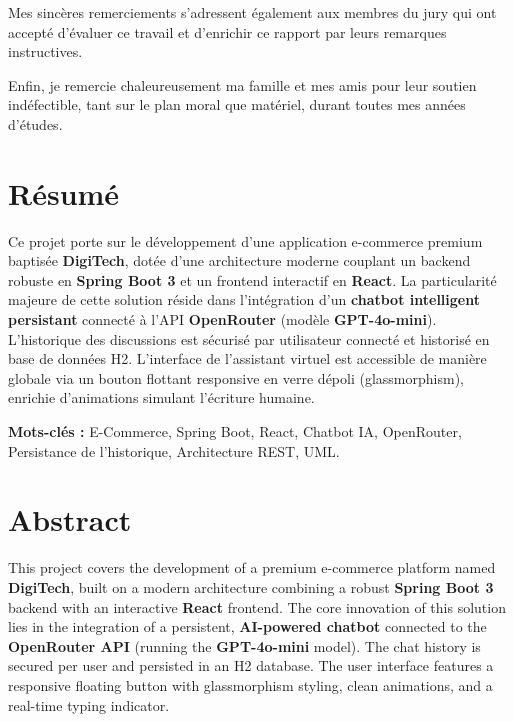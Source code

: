 \documentclass[12pt,a4paper,oneside]{report}
\begin{document}
Mes sincères remerciements s'adressent également aux membres du jury qui ont accepté d'évaluer ce travail et d'enrichir ce rapport par leurs remarques instructives.

Enfin, je remercie chaleureusement ma famille et mes amis pour leur soutien indéfectible, tant sur le plan moral que matériel, durant toutes mes années d'études.

\chapter*{Résumé}
Ce projet porte sur le développement d'une application e-commerce premium baptisée \textbf{DigiTech}, dotée d'une architecture moderne couplant un backend robuste en \textbf{Spring Boot 3} et un frontend interactif en \textbf{React}. La particularité majeure de cette solution réside dans l'intégration d'un \textbf{chatbot intelligent persistant} connecté à l'API \textbf{OpenRouter} (modèle \textbf{GPT-4o-mini}). L'historique des discussions est sécurisé par utilisateur connecté et historisé en base de données H2. L'interface de l'assistant virtuel est accessible de manière globale via un bouton flottant responsive en verre dépoli (glassmorphism), enrichie d'animations simulant l'écriture humaine.

\vspace{1.5cm}
\noindent\textbf{Mots-clés :} E-Commerce, Spring Boot, React, Chatbot IA, OpenRouter, Persistance de l'historique, Architecture REST, UML.

\newpage

\chapter*{Abstract}
This project covers the development of a premium e-commerce platform named \textbf{DigiTech}, built on a modern architecture combining a robust \textbf{Spring Boot 3} backend with an interactive \textbf{React} frontend. The core innovation of this solution lies in the integration of a persistent, \textbf{AI-powered chatbot} connected to the \textbf{OpenRouter API} (running the \textbf{GPT-4o-mini} model). The chat history is secured per user and persisted in an H2 database. The user interface features a responsive floating button with glassmorphism styling, clean animations, and a real-time typing indicator.
\end{document}
